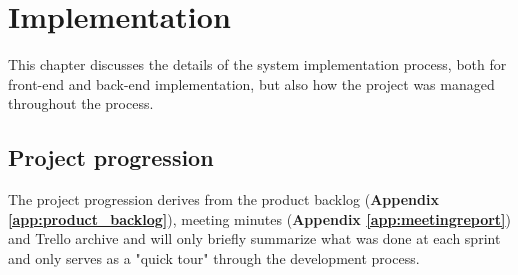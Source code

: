 
\chapter{Implementation}

This chapter discusses the details of the system implementation process, both for front-end and back-end implementation, but also how the project was managed throughout the process.


\section{Project progression}
The project progression derives from the product backlog (\textbf{Appendix \ref{app:product_backlog}}), meeting minutes (\textbf{Appendix \ref{app:meetingreport}}) and Trello archive and will only briefly summarize what was done at each sprint and only serves as a "quick tour" through the development process.


